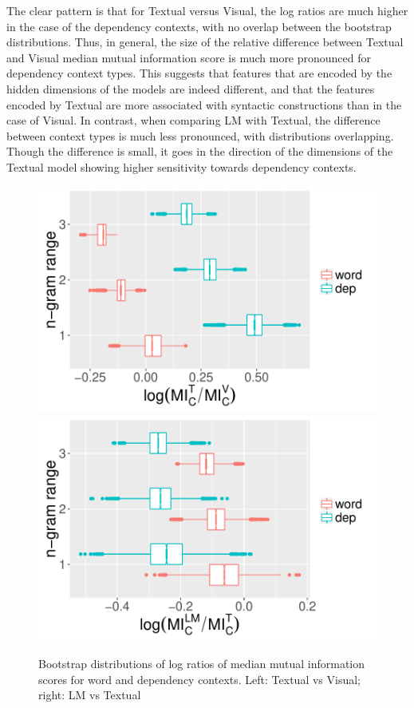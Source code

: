The clear pattern is that for {\sc Textual} versus {\sc Visual}, the
log ratios are much higher in the case of the dependency contexts,
with no overlap between the bootstrap distributions. Thus, in general,
the size of the relative difference between {\sc Textual} and {\sc
  Visual} median mutual information score is much more pronounced for
dependency context types.  This suggests that features that are
encoded by the hidden dimensions of the models are indeed different, and
that the features encoded by {\sc Textual} are more associated with
syntactic constructions than in the case of {\sc Visual}. In contrast,
when comparing {\sc LM} with {\sc Textual}, the difference between
context types is much less pronounced, with distributions
overlapping. Though the difference is small, it goes in the direction
of the dimensions of the {\sc Textual} model showing higher
sensitivity towards dependency contexts.

\begin{figure}
  \centering
  \includegraphics[scale=0.4]{bootstrappedMI.pdf}
  \includegraphics[scale=0.4]{bootstrappedMI2.pdf}
  \caption{Bootstrap distributions of log ratios of median mutual
    information scores for word and dependency contexts. Left: {\sc Textual}
      vs {\sc Visual}; right: {\sc LM} vs {\sc Textual}}
  \label{fig:mi-boot}
  \vspace{-.2cm}
\end{figure}


